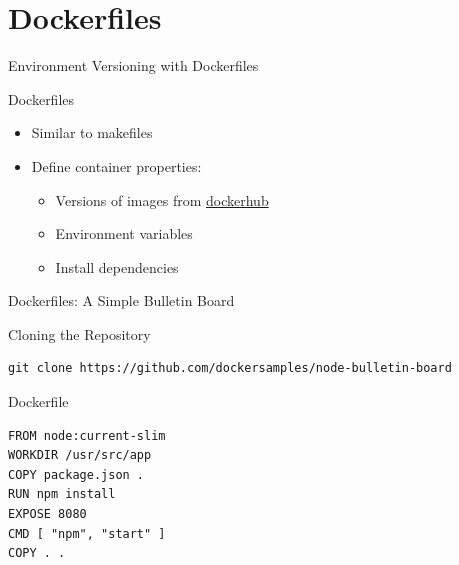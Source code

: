 \documentclass[10pt, compress, aspectratio=169, xcolor={table,usenames,dvipsnames}]{beamer}
\begin{document}
\section{Dockerfiles}
\label{sec:org1c6cc92}
\begin{frame}[label={sec:org49cc5cd}]{Environment Versioning with Dockerfiles}
\begin{block}{Dockerfiles}
\begin{itemize}
\item Similar to \alert{makefiles}
\item Define container \alert{properties}:
\begin{itemize}
\item Versions of images from \href{https://hub.docker.com/search?q=\&type=image}{dockerhub}
\item Environment variables
\item Install dependencies
\end{itemize}
\end{itemize}
\end{block}
\end{frame}
\begin{frame}[label={sec:orgd3df0e1},fragile]{Dockerfiles: A Simple Bulletin Board}
 \begin{block}{Cloning the Repository}
\lstset{language=bash,label= ,caption= ,captionpos=b,numbers=none}
\begin{lstlisting}
git clone https://github.com/dockersamples/node-bulletin-board
\end{lstlisting}
\end{block}
\begin{block}{Dockerfile}
\lstset{language=dockerfile,label= ,caption= ,captionpos=b,numbers=none}
\begin{lstlisting}
FROM node:current-slim
WORKDIR /usr/src/app
COPY package.json .
RUN npm install
EXPOSE 8080
CMD [ "npm", "start" ]
COPY . .
\end{lstlisting}
\end{block}
\end{frame}
\end{document}
